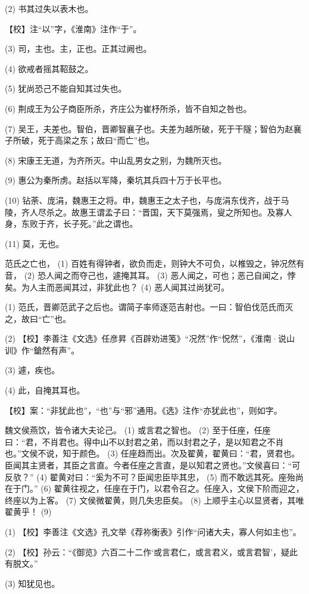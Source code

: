 \documentclass[12pt,UTF8]{ctexbook}
\begin{document}
(2) 书其过失以表木也。

【校】注“以”字，《淮南》注作“于”。

(3) 司，主也。主，正也。正其过阙也。

(4) 欲戒者摇其鞀鼓之。

(5) 犹尚恐己不能自知其过失也。

(6) 荆成王为公子商臣所杀，齐庄公为崔杼所杀，皆不自知之咎也。

(7) 吴王，夫差也。智伯，晋卿智襄子也。夫差为越所破，死于干隧；智伯为赵襄子所破，死于高梁之东；故曰“而亡”也。

(8) 宋康王无道，为齐所灭。中山乱男女之别，为魏所灭也。

(9) 惠公为秦所虏。赵括以军降，秦坑其兵四十万于长平也。

(10) 钻荼、庞涓，魏惠王之将。申，魏惠王之太子也，与庞涓东伐齐，战于马陵，齐人尽杀之。故惠王谓孟子曰：“晋国，天下莫强焉，叟之所知也。及寡人身，东败于齐，长子死。”此之谓也。

(11) 莫，无也。

范氏之亡也， (1) 百姓有得钟者，欲负而走，则钟大不可负，以椎毁之，钟况然有音， (2) 恐人闻之而夺己也，遽掩其耳。 (3) 恶人闻之，可也；恶己自闻之，悖矣。为人主而恶闻其过，非犹此也？ (4) 恶人闻其过尚犹可。

(1) 范氏，晋卿范武子之后也。谓简子率师逐范吉射也。一曰：智伯伐范氏而灭之，故曰“亡”也。

(2) 【校】李善注《文选》任彦昇《百辟劝进笺》“况然”作“怳然”，《淮南·说山训》作“鎗然有声”。

(3) 遽，疾也。

(4) 此，自掩其耳也。

【校】案：“非犹此也”，“也”与“邪”通用。《选》注作“亦犹此也”，则如字。

魏文侯燕饮，皆令诸大夫论己。 (1) 或言君之智也。 (2) 至于任座，任座曰：“君，不肖君也。得中山不以封君之弟，而以封君之子，是以知君之不肖也。”文侯不说，知于颜色。 (3) 任座趋而出。次及翟黄，翟黄曰：“君，贤君也。臣闻其主贤者，其臣之言直。今者任座之言直，是以知君之贤也。”文侯喜曰：“可反欤？” (4) 翟黄对曰：“奚为不可？臣闻忠臣毕其忠， (5) 而不敢远其死。座殆尚在于门。” (6) 翟黄往视之，任座在于门，以君令召之。任座入，文侯下阶而迎之，终座以为上客。 (7) 文侯微翟黄，则几失忠臣矣。 (8) 上顺乎主心以显贤者，其唯翟黄乎！ (9)

(1) 【校】李善注《文选》孔文举《荐祢衡表》引作“问诸大夫，寡人何如主也”。

(2) 【校】孙云：“《御览》六百二十二作‘或言君仁，或言君义，或言君智’，疑此有脱文。”

(3) 知犹见也。
\end{document}
